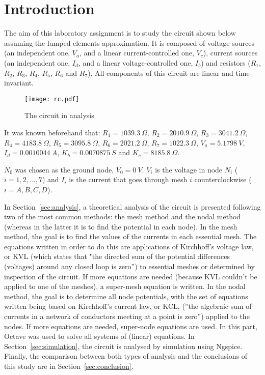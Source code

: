 \section{Introduction}
\label{sec:introduction}

\par
The aim of this laboratory assignment is to study the circuit shown below assuming the lumped-elements approximation. It is composed of voltage sources (an independent one, $V_a$, and a linear current-controlled one, $V_c$), current sources (an independent one, $I_d$, and a linear voltage-controlled one, $I_b$) and resistors ($R_1$, $R_2$, $R_3$, $R_4$, $R_5$, $R_6$ and $R_7$). All components of this circuit are linear and time-invariant.

\begin{figure}[h] \centering
\texttt{[image: rc.pdf]}
\caption{The circuit in analysis}
\label{fig:rc}
\end{figure}

\par
It was known beforehand that:
$R_1 = 1039.3 \ \Omega$,
$R_2 = 2010.9 \ \Omega$,
$R_3 = 3041.2 \ \Omega$,
$R_4 = 4183.8 \ \Omega$,
$R_5 = 3095.8 \ \Omega$,
$R_6 = 2021.2 \ \Omega$,
$R_7 = 1022.3 \ \Omega$,
$V_a = 5.1798 \ V$,
$I_d = 0.0010044 \ A$,
$K_b = 0.0070875 \ S$ and
$K_c = 8185.8 \ \Omega$.


\par
$N_0$ was chosen as the ground node, $V_0 = 0 \ V$. $V_i$ is the voltage in node $N_i$ ($i=1, 2, ..., 7$) and $I_i$  is the current that goes through mesh $i$ counterclockwise ($i=A, B, C, D$).

\par
In Section~\ref{sec:analysis}, a theoretical analysis of the circuit is presented following two of the most common methods: the mesh method and the nodal method (whereas in the latter it is to find the potential in each node). In the mesh method, the goal is to find the values of the currents in each essential mesh. The equations written in order to do this are applications of Kirchhoff's voltage law, or KVL (which states that "the directed sum of the potential differences (voltages) around any closed loop is zero'') to essential meshes or determined by inspection of the circuit. If more equations are needed (because KVL couldn't be applied to one of the meshes), a super-mesh equation is written. In the nodal method, the goal is to determine all node potentials, with the set of equations written being based on Kirchhoff's current law, or KCL, (''the algebraic sum of currents in a network of conductors meeting at a point is zero'') applied to the nodes. If more equations are needed, super-node equations are used. In this part, Octave was used to solve all systems of (linear) equations. In Section~\ref{sec:simulation}, the circuit is analysed by simulation using Ngspice. Finally, the comparison between both types of analysis and the conclusions of this study are in Section~\ref{sec:conclusion}.

